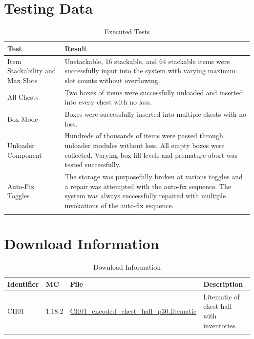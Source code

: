 \documentclass[10pt]{datasheet}
\begin{document}
\section{Testing Data}

\begin{table}[h]
\caption{Executed Tests}
\begin{tabularx}{\textwidth}{l | X}
    \thickhline
    \textbf{Test} & \textbf{Result} \\
    \hline
    Item Stackability and Max Slots & Unstackable, 16 stackable, and 64 stackable items were successfully input into the system with varying maxinum slot counts without overflowing.\\
    \hline
    All Chests & Two boxes of items were successfully unloaded and inserted into every chest with no loss.\\
    \hline
    Box Mode & Boxes were successfully inserted into multiple chests with no loss.\\
    \hline
    Unloader Component & Hundreds of thousands of items were passed through unloader modules without loss. All empty boxes were collected. Varying box fill levels and premature abort was tested successfully.\\
    \hline
    Auto-Fix Toggles & The storage was purposefully broken at various toggles and a repair was attempted with the auto-fix sequence. The system was always successfully repaired with multiple invokations of the auto-fix sequence.\\
    \thickhline
\end{tabularx}
\end{table}

\section{Download Information}
\begin{table}[h]
    \caption{Download Information}
    \begin{tabularx}{\textwidth}{l | l | l | X}
        \thickhline
        \textbf{Identifier} & \textbf{MC} & \textbf{File} & \textbf{Description} \\
        \hline
        CH01 & 1.18.2 & \href{https://github.com/Soontech-Annals/Archive/blob/364bde8dbcbc2e5337489ff435bcda9b387017e2/Archive/chest-halls/CH01\%20Parallelized\%20Encoded\%20Chest\%20Hall/CH01\_encoded\_chest\_hall\_p30.litematic?raw=1}{CH01\_encoded\_chest\_hall\_p30.litematic} & Litematic of chest hall with inventories. \\
        \thickhline
    \end{tabularx}
\end{table}
\end{document}
